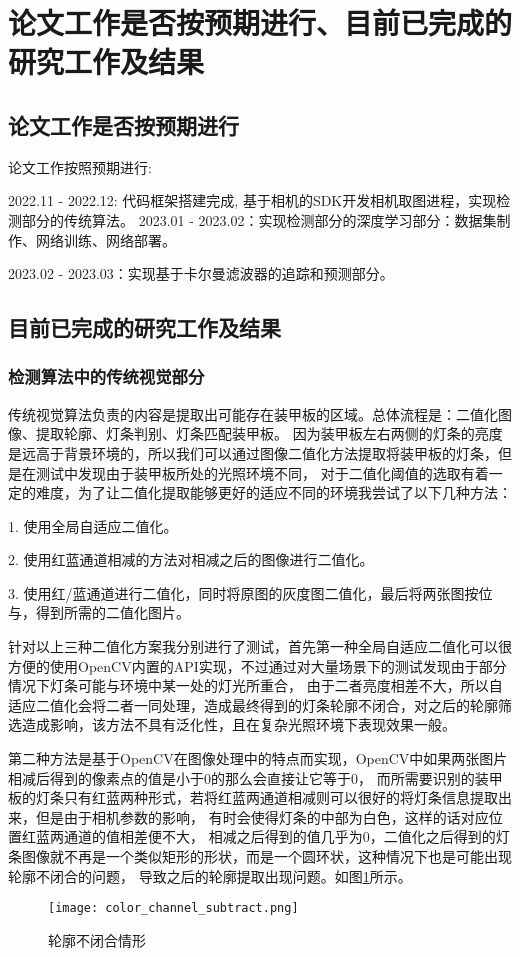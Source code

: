 \section{论文工作是否按预期进行、目前已完成的研究工作及结果}
\subsection{论文工作是否按预期进行}
论文工作按照预期进行: \par
2022.11 - 2022.12: 代码框架搭建完成, 基于相机的SDK开发相机取图进程，实现检测部分的传统算法。
2023.01 - 2023.02：实现检测部分的深度学习部分：数据集制作、网络训练、网络部署。\par
2023.02 - 2023.03：实现基于卡尔曼滤波器的追踪和预测部分。\par
\subsection{目前已完成的研究工作及结果}
\subsubsection{检测算法中的传统视觉部分}
传统视觉算法负责的内容是提取出可能存在装甲板的区域。总体流程是：二值化图像、提取轮廓、灯条判别、灯条匹配装甲板。
因为装甲板左右两侧的灯条的亮度是远高于背景环境的，所以我们可以通过图像二值化方法提取将装甲板的灯条，但是在测试中发现由于装甲板所处的光照环境不同，
对于二值化阈值的选取有着一定的难度，为了让二值化提取能够更好的适应不同的环境我尝试了以下几种方法：\par
1. 使用全局自适应二值化。\par
2. 使用红蓝通道相减的方法对相减之后的图像进行二值化。\par
3. 使用红/蓝通道进行二值化，同时将原图的灰度图二值化，最后将两张图按位与，得到所需的二值化图片。\par

针对以上三种二值化方案我分别进行了测试，首先第一种全局自适应二值化可以很方便的使用OpenCV\cite{bradski2000opencv}内置的API实现，不过通过对大量场景下的测试发现由于部分情况下灯条可能与环境中某一处的灯光所重合，
由于二者亮度相差不大，所以自适应二值化会将二者一同处理，造成最终得到的灯条轮廓不闭合，对之后的轮廓筛选造成影响，该方法不具有泛化性，且在复杂光照环境下表现效果一般。\par

第二种方法是基于OpenCV在图像处理中的特点而实现，OpenCV中如果两张图片相减后得到的像素点的值是小于0的那么会直接让它等于0，
而所需要识别的装甲板的灯条只有红蓝两种形式，若将红蓝两通道相减则可以很好的将灯条信息提取出来，但是由于相机参数的影响，
有时会使得灯条的中部为白色，这样的话对应位置红蓝两通道的值相差便不大，
相减之后得到的值几乎为0，二值化之后得到的灯条图像就不再是一个类似矩形的形状，而是一个圆环状，这种情况下也是可能出现轮廓不闭合的问题，
导致之后的轮廓提取出现问题。如图\ref{轮廓不闭合情形}所示。\par
\begin{figure}[H]
    \centering
    \texttt{[image: color\_channel\_subtract.png]} 
    \caption{轮廓不闭合情形} 
    \label{轮廓不闭合情形}
\end{figure}


